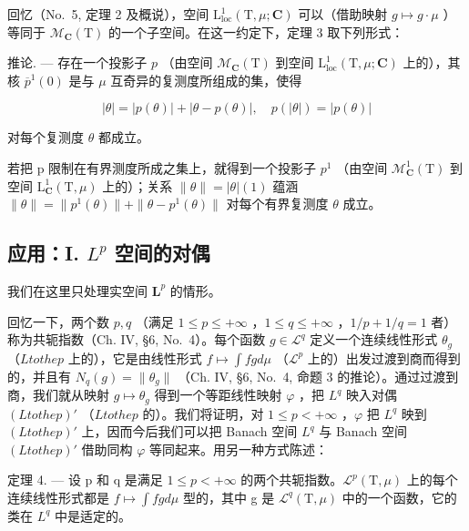 回忆（No.~5, 定理 2 及概说），空间 \(\mathrm{L}_{\mathrm{loc}}^{1}(\mathrm{T},\mu;\mathbf{C})\) 可以（借助映射 \(g\mapsto g\cdot\mu\) ）等同于 \(\mathcal{M}_{\mathbf{C}}(\mathrm{T})\) 的一个子空间。在这一约定下，定理 3 取下列形式：

推论. --- 存在一个投影子 \(p\) （由空间 \(\mathcal{M}_{\mathbf{C}}(\mathrm{T})\) 到空间 \(\mathrm{L}_{\mathrm{loc}}^{1}(\mathrm{T},\mu ;\mathbf{C})\) 上的），其核 \(\overline{p}^{1}(0)\) 是与 \(\mu\) 互奇异的复测度所组成的集，使得

\[
| \theta | = | p (\theta) | + | \theta - p (\theta) |, \quad p (| \theta |) = | p (\theta) |
\]

对每个复测度 \(\theta\) 都成立。

若把 p 限制在有界测度所成之集上，就得到一个投影子 \(p^{1}\) （由空间 \(\mathcal{M}_{\mathbf{C}}^{1}(\mathrm{T})\) 到空间 \(\mathrm{L}_{\mathbf{C}}^{1}(\mathrm{T},\mu)\) 上的）；关系 \(\|\theta\|=|\theta|(1)\) 蕴涵 \(\|\theta\|=\|p^{1}(\theta)\|+\|\theta-p^{1}(\theta)\|\) 对每个有界复测度 \(\theta\) 成立。

\subsection{\texorpdfstring{应用：I. \(L^{p}\) 空间的对偶}{应用：I. L to the p 空间的对偶}}

我们在这里只处理实空间 \(\mathbf{L}^p\) 的情形。

回忆一下，两个数 \(p, q\) （满足 \(1 \leqslant p \leqslant +\infty\) ，\(1 \leqslant q \leqslant +\infty\) ，\(1/p + 1/q = 1\) 者）称为共轭指数（Ch. IV, §6, No.~4）。每个函数 \(g \in \mathcal{L}^q\) 定义一个连续线性形式 \(\theta_g\) （\(L to the p\) 上的），它是由线性形式 \(f \mapsto \int fg d\mu\) （\(\mathcal{L}^p\) 上的）出发过渡到商而得到的，并且有 \(N_q(g) = \| \theta_g \|\) （Ch. IV, §6, No.~4, 命题 3 的推论）。通过过渡到商，我们就从映射 \(g \mapsto \theta_g\) 得到一个等距线性映射 \(\varphi\) ，把 \(L^q\) 映入对偶 \((L to the p)'\) （\(L to the p\) 的）。我们将证明，对 \(1 \leqslant p < +\infty\) ，\(\varphi\) 把 \(L^q\) 映到 \((L to the p)'\) 上，因而今后我们可以把 Banach 空间 \(L^q\) 与 Banach 空间 \((L to the p)'\) 借助同构 \(\varphi\) 等同起来。用另一种方式陈述：

定理 4. --- 设 p 和 q 是满足 \(1 \leqslant p < +\infty\) 的两个共轭指数。\(\mathcal{L}^{p}(\mathrm{T}, \mu)\) 上的每个连续线性形式都是 \(f \mapsto \int fg d\mu\) 型的，其中 g 是 \(\mathcal{L}^{q}(\mathrm{T}, \mu)\) 中的一个函数，它的类在 \(L^{q}\) 中是适定的。

